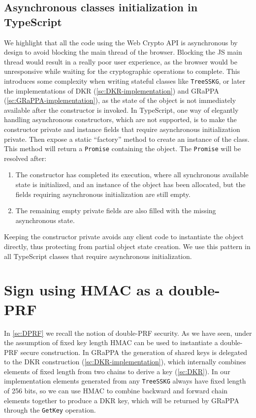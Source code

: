 \subsection{Asynchronous classes initialization in TypeScript}\label{pg:async-classes-init}
We highlight that all the code using the Web Crypto API is 
asynchronous by design to avoid blocking
the main thread of the browser. Blocking the JS main thread
would result in a really poor user experience, as the browser
would be unresponsive while waiting for the cryptographic
operations to complete. This introduces some complexity
when writing stateful classes like \texttt{TreeSSKG},
or later the implementations of DKR (\cref{sc:DKR-implementation})
and GRaPPA (\cref{sc:GRaPPA-implementation}), as the state
of the object is not immediately available after the constructor
is invoked. In TypeScript, one way of elegantly handling
asynchronous constructors, which are not supported, is to make the constructor private
and instance fields that require asynchronous initialization
private. Then expose a static ``factory'' method to create an 
instance of the class.
This method will return a \texttt{Promise} containing the object.
The \texttt{Promise} will be resolved after:
\begin{enumerate}
    \item The constructor has 
    completed its execution, where all synchronous available state
    is initialized, and an instance of the object has been allocated,
    but the fields requiring asynchronous initialization are still
    empty.
    \item The remaining empty private fields are also filled with the missing asynchronous state.
\end{enumerate}
Keeping the constructor private avoids any client code to
instantiate the object directly, thus protecting from
partial object state creation.
We use this pattern in all TypeScript classes that require asynchronous initialization.

\section{Sign using HMAC as a double-PRF}\label{sc:ssf-double-prf}
In \cref{sc:DPRF} we recall the notion of double-PRF security.
As we have seen, under the assumption of fixed key length HMAC 
can be used to instantiate a double-PRF secure construction.
In GRaPPA the generation of shared keys is delegated to the
DKR construction (\cref{sc:DKR-implementation}), which 
internally combines elements of fixed
length from two chains to derive a key (\cref{sc:DKR}).
In our implementation elements generated from any \texttt{TreeSSKG}
always have fixed length of 256 bits, so we can use HMAC to 
combine backward and forward chain elements together to
produce a DKR key, which will be returned by GRaPPA through
the \texttt{GetKey} operation.


